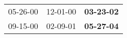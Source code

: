 \begin{supertabular}{p{0.33\columnwidth}p{0.33\columnwidth}p{0.33\columnwidth}}
 05-26-00\textsuperscript{} &  12-01-00\textsuperscript{} &  \textbf{03-23-02\textsuperscript{}} \\
 09-15-00\textsuperscript{} &  02-09-01\textsuperscript{} &  \textbf{05-27-04\textsuperscript{}} \\
\end{supertabular}
